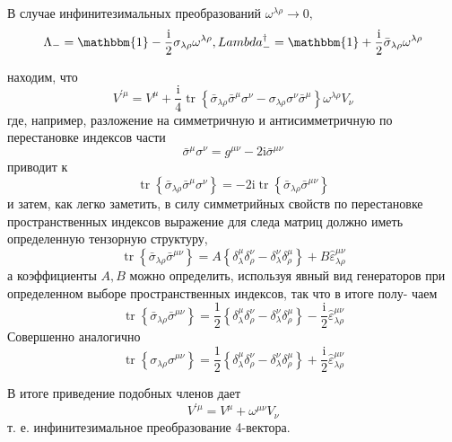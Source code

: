 \documentclass[a4paper,12pt]{article} %
\begin{document}
\begin{task}
В случае инфинитезимальных преобразований $\omega^{\lambda \rho} \rightarrow 0,$
$$
\Lambda_{-}=\mathbbm{1}-\frac{\mathrm{i}}{2} \sigma_{\lambda \rho} \omega^{\lambda \rho}, 
\quad 
\\Lambda_{-}^{\dagger}=\mathbbm{1}+\frac{\mathrm{i}}{2} \bar{\sigma}_{\lambda \rho} \omega^{\lambda \rho}
$$


находим, что
$$
V^{\prime \mu}=
V^{\mu}
+
\frac{\mathrm{i}}{4} \operatorname{tr}\left\{
\bar{\sigma}_{\lambda \rho} \bar{\sigma}^{\mu} \sigma^{\nu}-\sigma_{\lambda \rho} \sigma^{\nu} \bar{\sigma}^{\mu}
\right\} \omega^{\lambda \rho} V_{\nu}
$$
где, например, разложение на симметричную и антисимметричную по перестановке индексов части
$$
\bar{\sigma}^{\mu} \sigma^{\nu}=g^{\mu \nu}-2 \mathrm{i} \bar{\sigma}^{\mu \nu}
$$
приводит к
$$
\operatorname{tr}\left\{\bar{\sigma}_{\lambda \rho} \bar{\sigma}^{\mu} \sigma^{\nu}\right\}=-2 \mathrm{i} \operatorname{tr}\left\{\bar{\sigma}_{\lambda \rho} \bar{\sigma}^{\mu \nu}\right\}
$$
и затем, как легко заметить, в силу симметрийных свойств по перестановке пространственных индексов выражение для следа матриц должно иметь
определенную тензорную структуру,
$$
\operatorname{tr}\left\{\bar{\sigma}_{\lambda \rho} \bar{\sigma}^{\mu \nu}\right\}=A\left\{\delta_{\lambda}^{\mu} \delta_{\rho}^{\nu}-\delta_{\lambda}^{\nu} \delta_{\rho}^{\mu}\right\}+B \hat{\varepsilon}_{\lambda \rho}^{\mu \nu}
$$
а коэффициенты $A, B$ можно определить, используя явный вид генераторов при определенном выборе пространственных индексов, так что в итоге полу-
чаем
$$
\operatorname{tr}\left\{\bar{\sigma}_{\lambda \rho} \bar{\sigma}^{\mu \nu}\right\}=\frac{1}{2}\left\{\delta_{\lambda}^{\mu} \delta_{\rho}^{\nu}-\delta_{\lambda}^{\nu} \delta_{\rho}^{\mu}\right\}-\frac{\mathrm{i}}{2} \hat{\varepsilon}_{\lambda \rho}^{\mu \nu}
$$
Совершенно аналогично
$$
\operatorname{tr}\left\{\sigma_{\lambda \rho} \sigma^{\mu \nu}\right\}=\frac{1}{2}\left\{\delta_{\lambda}^{\mu} \delta_{\rho}^{\nu}-\delta_{\lambda}^{\nu} \delta_{\rho}^{\mu}\right\}+\frac{\mathrm{i}}{2} \hat{\varepsilon}_{\lambda \rho}^{\mu \nu}
$$



В итоге приведение подобных членов дает
$$
V^{\prime \mu}=V^{\mu}+\omega^{\mu \nu} V_{\nu}
$$
т. е. инфинитезимальное преобразование 4-вектора.





\end{task}
\end{document}
